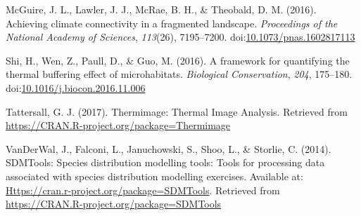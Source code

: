 \documentclass[12pt,british,a4paper,]{article}
\begin{document}
\leavevmode\hypertarget{ref-mcguire_achieving_2016}{}%
McGuire, J. L., Lawler, J. J., McRae, B. H., \& Theobald, D. M. (2016). Achieving climate connectivity in a fragmented landscape. \emph{Proceedings of the National Academy of Sciences}, \emph{113}(26), 7195--7200. doi:\href{https://doi.org/10.1073/pnas.1602817113}{10.1073/pnas.1602817113}

\leavevmode\hypertarget{ref-shi_framework_2016}{}%
Shi, H., Wen, Z., Paull, D., \& Guo, M. (2016). A framework for quantifying the thermal buffering effect of microhabitats. \emph{Biological Conservation}, \emph{204}, 175--180. doi:\href{https://doi.org/10.1016/j.biocon.2016.11.006}{10.1016/j.biocon.2016.11.006}

\leavevmode\hypertarget{ref-tattersall_thermimage:_2017}{}%
Tattersall, G. J. (2017). Thermimage: Thermal Image Analysis. Retrieved from \url{https://CRAN.R-project.org/package=Thermimage}

\leavevmode\hypertarget{ref-sdmtools_2014}{}%
VanDerWal, J., Falconi, L., Januchowski, S., Shoo, L., \& Storlie, C. (2014). SDMTools: Species distribution modelling tools: Tools for processing data associated with species distribution modelling exercises. Available at: \href{https://CRAN.R-project.org/package=SDMTools}{Https://cran.r-project.org/package=SDMTools}. Retrieved from \url{https://CRAN.R-project.org/package=SDMTools}
\end{document}
